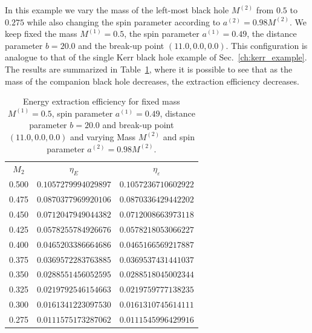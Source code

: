In this example we vary the mass of the left-most black hole $M^{(2)}$ from $0.5$ to $0.275$ while also changing the spin parameter according to $a^{(2)} = 0.98 M^{(2)}$. We keep fixed the mass $M^{(1)} = 0.5$, the spin parameter $a^{(1)} = 0.49$, the distance parameter $b=20.0$ and the break-up point $(11.0, 0.0, 0.0)$. This configuration is analogue to that of the single Kerr black hole example of Sec.~\ref{ch:kerr_example}. The results are summarized in Table~\ref{tab:arbitrary_penrose_sks_example_results_M2_variation}, where it is possible to see that as the mass of the companion black hole decreases, the extraction efficiency decreases.

\begin{table}[]
  \centering
  \begin{tabular}{ccc}
    \hline\hline
    $M_2$ & $\eta_E$             & $\eta_\varepsilon$   \\
    0.500 & $0.1057279994029897$ & $0.1057236710602922$ \\
    0.475 & $0.0870377969920106$ & $0.0870336429442202$ \\
    0.450 & $0.0712047949044382$ & $0.0712008663973118$ \\
    0.425 & $0.0578255784926676$ & $0.0578218053066227$ \\
    0.400 & $0.0465203386664686$ & $0.0465166569217887$ \\
    0.375 & $0.0369572283763885$ & $0.0369537431441037$ \\
    0.350 & $0.0288551456052595$ & $0.0288518045002344$ \\
    0.325 & $0.0219792546154663$ & $0.0219759777138235$ \\
    0.300 & $0.0161341223097530$ & $0.0161310745614111$ \\
    0.275 & $0.0111575173287062$ & $0.0111545996429916$ \\ \hline\hline
  \end{tabular}
  \caption{Energy extraction efficiency for fixed mass $M^{(1)} = 0.5$, spin parameter $a^{(1)} = 0.49$, distance parameter $b=20.0$ and break-up point $(11.0, 0.0, 0.0)$ and varying Mass $M^{(2)}$ and spin parameter $a^{(2)} = 0.98 M^{(2)}$.}
  \label{tab:arbitrary_penrose_sks_example_results_M2_variation}
\end{table}